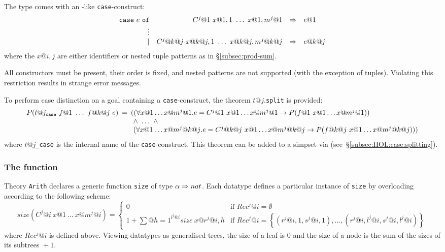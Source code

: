 The type comes with an \ML-like \texttt{case}-construct:
\[
\begin{array}{rrcl}
\mbox{\tt case}~e~\mbox{\tt of} & C^j@1~x@{1,1}~\dots~x@{1,m^j@1} & \Rightarrow & e@1 \\
                           \vdots \\
                           \mid & C^j@{k@j}~x@{k@j,1}~\dots~x@{k@j,m^j@{k@j}} & \Rightarrow & e@{k@j}
\end{array}
\]
where the $x@{i,j}$ are either identifiers or nested tuple patterns as in
{\S}\ref{subsec:prod-sum}.
\begin{warn}
  All constructors must be present, their order is fixed, and nested patterns
  are not supported (with the exception of tuples).  Violating this
  restriction results in strange error messages.
\end{warn}

To perform case distinction on a goal containing a \texttt{case}-construct,
the theorem $t@j.$\texttt{split} is provided:
\[
\begin{array}{@{}rcl@{}}
P(t@j_\mathtt{case}~f@1~\dots~f@{k@j}~e) &\!\!\!=&
\!\!\! ((\forall x@1 \dots x@{m^j@1}. e = C^j@1~x@1\dots x@{m^j@1} \to
                             P(f@1~x@1\dots x@{m^j@1})) \\
&&\!\!\! ~\land~ \dots ~\land \\
&&~\!\!\! (\forall x@1 \dots x@{m^j@{k@j}}. e = C^j@{k@j}~x@1\dots x@{m^j@{k@j}} \to
                             P(f@{k@j}~x@1\dots x@{m^j@{k@j}})))
\end{array}
\]
where $t@j$\texttt{_case} is the internal name of the \texttt{case}-construct.
This theorem can be added to a simpset via 
(see~{\S}\ref{subsec:HOL:case:splitting}).

\subsubsection{The function }\label{sec:HOL:size}

Theory \texttt{Arith} declares a generic function \texttt{size} of type
$\alpha\Rightarrow nat$.  Each datatype defines a particular instance of \texttt{size}
by overloading according to the following scheme:
\[
size(C^j@i~x@1~\dots~x@{m^j@i}) = \!
\left\{
\begin{array}{ll}
0 & \!\mbox{if $Rec^j@i = \emptyset$} \\
1+\sum\limits@{h=1}^{l^j@i}size~x@{r^j@{i,h}} &
 \!\mbox{if $Rec^j@i = \left\{\left(r^j@{i,1},s^j@{i,1}\right),\ldots,
  \left(r^j@{i,l^j@i},s^j@{i,l^j@i}\right)\right\}$}
\end{array}
\right.
\]
where $Rec^j@i$ is defined above.  Viewing datatypes as generalised trees, the
size of a leaf is 0 and the size of a node is the sum of the sizes of its
subtrees ${}+1$.

